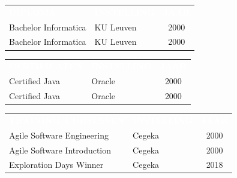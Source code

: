 \documentclass{article}%
\begin{document}
%
\begin{tabularx}{\textwidth}{X | l | c}%
\rowcolor{cegekagreen}%
\textcolor{white}{ 
\textbf{DIPLOMA}
}&\textcolor{white}{ 
\textbf{INSTELLING}
}&\textcolor{white}{ 
\textbf{JAAR}
}\\%
Bachelor Informatica&KU Leuven&2000\\%
\hline%
Bachelor Informatica&KU Leuven&2000\\%
\hline%
\end{tabularx}%
\newline%
\vspace*{1.5cm}%
\begin{tabularx}{\textwidth}{X | l | c}%
\rowcolor{cegekagreen}%
\textcolor{white}{ 
\textbf{CERTIFICATEN}
}&\textcolor{white}{ 
\textbf{INSTELLING}
}&\textcolor{white}{ 
\textbf{JAAR}
}\\%
Certified Java&Oracle&2000\\%
\hline%
Certified Java&Oracle&2000\\%
\hline%
\end{tabularx}%
\newline%
\vspace*{1.5cm}%
\begin{tabularx}{\textwidth}{X | l | c}%
\rowcolor{cegekagreen}%
\textcolor{white}{ 
\textbf{TRAINING/CURSUSSEN}
}&\textcolor{white}{ 
\textbf{INSTELLING}
}&\textcolor{white}{ 
\textbf{JAAR}
}\\%
Agile Software Engineering&Cegeka&2000\\%
\hline%
Agile Software Introduction&Cegeka&2000\\%
\hline%
Exploration Days Winner&Cegeka&2018\\%
\hline%
\end{tabularx}%
\end{document}
